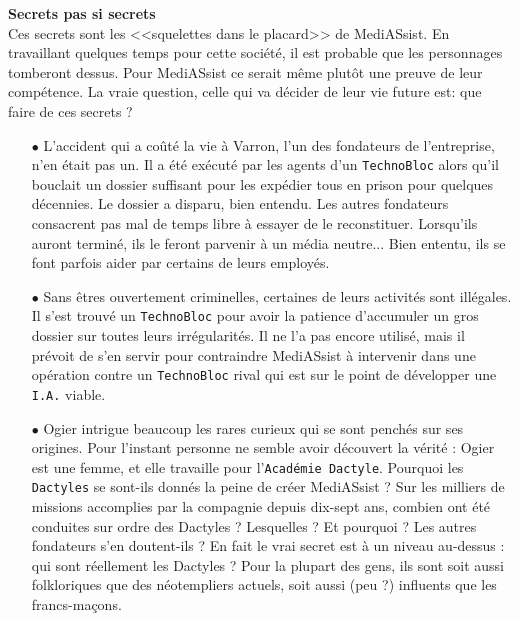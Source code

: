 \documentclass[11pt,twoside,a4paper]{article}
\begin{document}
\begin{multicols}{2}
\vfill
\columnbreak

\textbf{\Large Secrets pas si secrets}~\\

Ces secrets sont les <<squelettes dans le placard>> de MediASsist. En travaillant quelques temps pour cette soci{\'e}t{\'e}, il est probable que les personnages tomberont dessus. Pour MediASsist ce serait m{\^e}me plut{\^o}t une preuve de leur comp{\'e}tence. La vraie question, celle qui va d{\'e}cider de leur vie future est: que faire de ces secrets ?
\begin{itemize}
	\item[$\bullet$] L'accident qui a co{\^u}t{\'e} la vie {\`a} Varron, l'un des fondateurs de l'entreprise, n'en {\'e}tait pas un. Il a {\'e}t{\'e} ex{\'e}cut{\'e} par les agents d'un \texttt{TechnoBloc} alors qu'il bouclait un dossier suffisant pour les exp{\'e}dier tous en prison pour quelques d{\'e}cennies. Le dossier a disparu, bien entendu. Les autres fondateurs consacrent pas mal de temps libre {\`a} essayer de le reconstituer. Lorsqu'ils auront termin{\'e}, ils le feront parvenir {\`a} un m{\'e}dia neutre... Bien ententu, ils se font parfois aider par certains de leurs employ{\'e}s. 
	\item[$\bullet$] Sans {\^e}tres ouvertement criminelles, certaines de leurs activit{\'e}s sont ill{\'e}gales. Il s'est trouv{\'e} un \texttt{TechnoBloc} pour avoir la patience d'accumuler un gros dossier sur toutes leurs irr{\'e}gularit{\'e}s. Il ne l'a pas encore utilis{\'e}, mais il pr{\'e}voit de s'en servir pour contraindre \mbox{MediASsist} {\`a} intervenir dans une op{\'e}ration contre un \texttt{TechnoBloc} rival qui est sur le point de d{\'e}velopper une \texttt{I.A.} viable. 
	\item[$\bullet$] Ogier intrigue beaucoup les rares curieux qui se sont pench{\'e}s sur ses origines. Pour l'instant personne ne semble avoir d{\'e}couvert la v{\'e}rit{\'e} : Ogier est une femme, et elle travaille pour l'\texttt{Acad{\'e}mie Dactyle}. Pourquoi les \texttt{Dactyles} se sont-ils donn{\'e}s la peine de cr{\'e}er MediASsist ? Sur les milliers de missions accomplies par la compagnie depuis dix-sept ans, combien ont {\'e}t{\'e} conduites sur ordre des Dactyles ? Lesquelles ? Et pourquoi ? Les autres fondateurs s'en doutent-ils ? En fait le vrai secret est {\`a} un niveau au-dessus : qui sont r{\'e}ellement les Dactyles ? Pour la plupart des gens, ils sont soit aussi folkloriques que des n{\'e}otempliers actuels, soit aussi (peu ?) influents que les francs-ma\c{c}ons.  
\end{itemize} %


\end{multicols}
\end{document}
